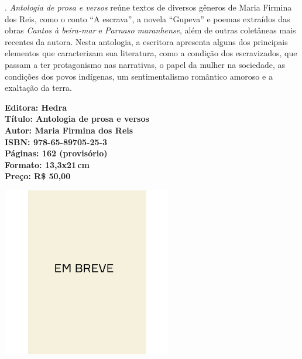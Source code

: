 \hspace*{-7cm}\hrulefill\hspace*{-7cm}

\medskip

\noindent{}. \textit{Antologia de prosa e versos} reúne textos de diversos gêneros de Maria Firmina dos Reis, como o conto ``A escrava'', a novela ``Gupeva'' e poemas extraídos das obras \textit{Cantos à beira-mar} e \textit{Parnaso maranhense}, além de outras coletâneas mais recentes da autora. Nesta antologia, a escritora apresenta alguns dos principais elementos que caracterizam sua literatura, como a condição dos escravizados, que passam a ter protagonismo nas narrativas, o papel da mulher na sociedade, as condições dos povos indígenas, um sentimentalismo romântico amoroso e a exaltação da terra.
\vfill

\noindent\begin{minipage}[c]{1\linewidth}
{\small\textbf{
\hspace*{-.1cm}Editora: Hedra\\
Título: Antologia de prosa e versos\\
Autor: Maria Firmina dos Reis\\ 
ISBN: 978-65-89705-25-3\\
Páginas: 162 (provisório)\\
Formato: 13,3x21\,cm\\
Preço: R\$ 50,00\\
}}
\end{minipage}

\pagebreak

\begin{center}
\hspace*{.5cm}\includegraphics[width=74mm]{./CAPAS/breve.jpeg}
\end{center}

